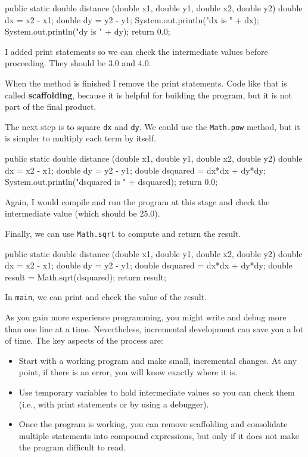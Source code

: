 \documentclass[12pt]{book}
\theoremstyle{exercise}
\begin{document}
\begin{code}
    public static double distance
            (double x1, double y1, double x2, double y2) {
        double dx = x2 - x1;
        double dy = y2 - y1;
        System.out.println("dx is " + dx);
        System.out.println("dy is " + dy);
        return 0.0;
    }
\end{code}

I added print statements so we can check the intermediate values before proceeding.
They should be 3.0 and 4.0.


When the method is finished I remove the print statements.
Code like that is called {\bf scaffolding}, because it is helpful for building the program, but it is not part of the final product.

The next step is to square {\tt dx} and {\tt dy}.
We could use the {\tt Math.pow} method, but it is simpler to multiply each term by itself.

\begin{code}
    public static double distance
            (double x1, double y1, double x2, double y2) {
        double dx = x2 - x1;
        double dy = y2 - y1;
        double dsquared = dx*dx + dy*dy;
        System.out.println("dsquared is " + dsquared);
        return 0.0;
    }
\end{code}

Again, I would compile and run the program at this stage and check the intermediate value (which should be 25.0).

Finally, we can use {\tt Math.sqrt} to compute and return the result.

\begin{code}
    public static double distance
            (double x1, double y1, double x2, double y2) {
        double dx = x2 - x1;
        double dy = y2 - y1;
        double dsquared = dx*dx + dy*dy;
        double result = Math.sqrt(dsquared);
        return result;
    }
\end{code}

In {\tt main}, we can print and check the value of the result.

As you gain more experience programming, you might write and debug more than one line at a time.
Nevertheless, incremental development can save you a lot of time.
The key aspects of the process are:

\begin{itemize}

\item Start with a working program and make small, incremental changes.
At any point, if there is an error, you will know exactly where it is.

\item Use temporary variables to hold intermediate values so you can check them (i.e., with print statements or by using a debugger).

\item Once the program is working, you can remove scaffolding and consolidate multiple statements into compound expressions, but only if it does not make the program difficult to read.

\end{itemize}
\end{document}

